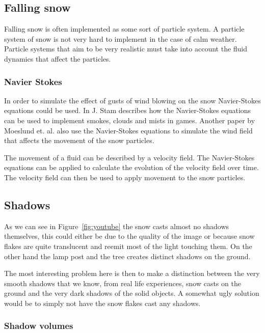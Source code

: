 \documentclass[a4paper,12pt]{article}
\begin{document}
\subsection{Falling snow}

Falling snow is often implemented as some sort of particle system. A particle system of snow is not very hard to implement in the case of calm weather. Particle systems that aim to be very realistic must take into account the fluid dynamics that affect the particles.

\subsubsection{Navier Stokes}

In order to simulate the effect of gusts of wind blowing on the snow Navier-Stokes equations could be used. In \cite{fluid-dynamics} J. Stam describes how the Navier-Stokes equations can be used to implement smokes, clouds and mists in games. Another paper \cite{modeling-falling-accumulating-snow} by Moeslund et. al. also use the Navier-Stokes equations to simulate the wind field that affects the movement of the snow particles.

The movement of a fluid can be described by a velocity field. The Navier-Stokes equations can be applied to calculate the evolution of the velocity field over time. The velocity field can then be used to apply movement to the snow particles. \cite{fluid-dynamics}



\subsection{Shadows}

As we can see in Figure~\ref{fig:youtube} the snow casts almost no shadows themselves, this could either be due to the quality of the image or because snow flakes are quite translucent and reemit most of the light touching them. On the other hand the lamp post and the tree creates distinct shadows on the ground.

The most interesting problem here is then to make a distinction between the very smooth shadows that we know, from real life experiences, snow casts on the ground and the very dark shadows of the solid objects. A somewhat ugly solution would be to simply not have the snow flakes cast any shadows.


\subsubsection{Shadow volumes}
\end{document}
